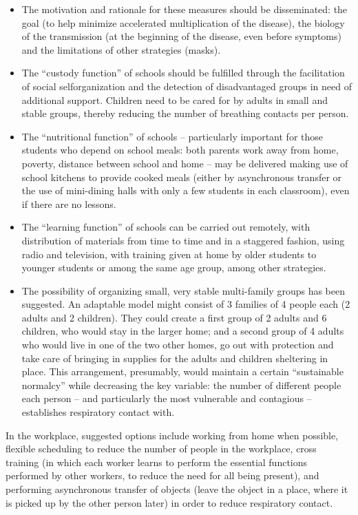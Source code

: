 \documentclass[12pt, a4]{scrartcl}
\begin{document}
\begin{itemize}
	\item The motivation and rationale for these measures should be disseminated: the goal (to help minimize accelerated multiplication of the disease), the biology of the transmission (at the beginning of the disease, even before symptoms) and the limitations of other strategies (masks).
	\item The “custody function” of schools should be fulfilled through the facilitation of social selforganization and the detection of disadvantaged groups in need of additional support. Children need to be cared for by adults in small and stable groups, thereby reducing the number of breathing contacts per person.
	\item The “nutritional function” of schools – particularly important for those students who depend on school meals: both parents work away from home, poverty, distance between school and home – may be delivered making use of school kitchens to provide cooked meals (either by asynchronous transfer or the use of mini-dining halls with only a few students in each classroom), even if there are no lessons.
	\item The “learning function” of schools can be carried out remotely, with distribution of materials from time to time and in a staggered fashion, using radio and television, with training given at home by older students to younger students or among the same age group, among other strategies.
	\item The possibility of organizing small, very stable multi-family groups has been suggested. An adaptable model might consist of 3 families of 4 people each (2 adults and 2 children). They could create a first group of 2 adults and 6 children, who would stay in the larger home; and a second group of 4 adults who would live in one of the two other homes, go out with protection and take care of bringing in supplies for the adults and children sheltering in place. This arrangement, presumably, would maintain a certain “sustainable normalcy” while decreasing the key variable: the number of different people each person – and particularly the most vulnerable and contagious – establishes respiratory contact with.
\end{itemize}

In the workplace, suggested options include working from home when possible, flexible scheduling to reduce the number of people in the workplace, cross training (in which each worker learns to perform the essential functions performed by other workers, to reduce the need for all being present), and performing asynchronous transfer of objects (leave the object in a place, where it is picked up by the other person later) in order to reduce respiratory contact.
\end{document}
